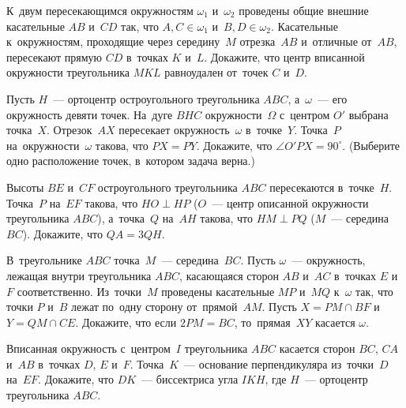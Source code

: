 



\begin{problems}

\item
К~двум пересекающимся окружностям $\omega_{1}$ и~$\omega_{2}$ проведены общие
внешние касательные $AB$ и~$CD$ так, что $A, C \in \omega_{1}$
и~$B, D \in \omega_{2}$.
Касательные к~окружностям, проходящие через середину~$M$ отрезка~$AB$
и~отличные от~$AB$, пересекают прямую $CD$ в~точках $K$ и~$L$.
Докажите, что центр вписанной окружности треугольника $MKL$ равноудален
от~точек $C$ и~$D$.

\item
Пусть $H$~--- ортоцентр остроугольного треугольника $ABC$, а~$\omega$~---
его окружность девяти точек.
На~дуге $BHC$ окружности~$\Omega$ с~центром $O'$ выбрана точка~$X$.
Отрезок~$AX$ пересекает окружность~$\omega$ в~точке~$Y$.
Точка~$P$ на~окружности~$\omega$ такова, что $PX = PY$.
Докажите, что $\angle O'PX = 90^\circ$.
(Выберите одно расположение точек, в~котором задача верна.)

\item
Высоты $BE$ и~$CF$ остроугольного треугольника $ABC$ пересекаются в~точке~$H$.
Точка~$P$ на~$EF$ такова, что $HO \perp HP$
($O$~--- центр описанной окружности треугольника $ABC$),
а~точка~$Q$ на~$AH$ такова, что $HM \perp PQ$ ($M$~--- середина~$BC$).
Докажите, что $QA = 3 QH$.

\item
В~треугольнике $ABC$ точка~$M$~--- середина~$BC$.
Пусть $\omega$~--- окружность, лежащая внутри треугольника $ABC$, касающаяся
сторон $AB$ и~$AC$ в~точках $E$ и~$F$ соответственно.
Из~точки~$M$ проведены касательные $MP$ и~$MQ$ к~$\omega$ так, что
точки $P$ и~$B$ лежат по~одну сторону от~прямой~$AM$.
Пусть $X = PM \cap BF $ и~$Y = QM \cap CE$.
Докажите, что если $2 PM = BC$, то~прямая~$XY$ касается $\omega$.

\item
Вписанная окружность с~центром~$I$ треугольника $ABC$ касается
сторон $BC$, $CA$ и~$AB$ в~точках $D$, $E$ и~$F$.
Точка~$K$~--- основание перпендикуляра из~точки~$D$ на~$EF$.
Докажите, что $DK$~--- биссектриса угла $IKH$, где $H$~--- ортоцентр
треугольника $ABC$.


\end{problems}
